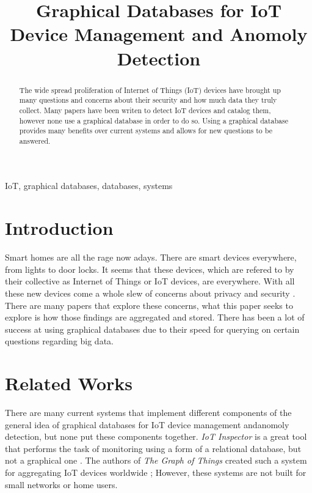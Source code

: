 \documentclass[conference]{IEEEtran}
\begin{document}
\title{Graphical Databases for IoT Device Management and Anomoly Detection}

\author{
}

\maketitle

\begin{abstract}
The wide spread proliferation of Internet of Things (IoT) devices
have brought up many questions and concerns about their security
and how much data they truly collect.
Many papers have been writen to detect IoT devices and catalog them,
however none use a graphical database in order to do so.
Using a graphical database provides many benefits over current systems
and allows for new questions to be answered.
\end{abstract}

\begin{IEEEkeywords}
IoT, graphical databases, databases, systems
\end{IEEEkeywords}

\section{Introduction}
Smart homes are all the rage now adays. There are smart devices everywhere, from lights to door locks.
It seems that these devices, which are refered to by their collective as Internet of Things or IoT devices, are everywhere.
With all these new devices come a whole slew of concerns about privacy and security \cite{IoTInspector}.
There are many papers that explore these concerns, what this paper seeks to explore is how those findings are
aggregated and stored. There has been a lot of success at using graphical databases due to their speed for querying
on certain questions regarding big data.

\section{Related Works}
There are many current systems that implement different components of the general idea of graphical databases for
IoT device management andanomoly detection, but none put these components together. \textit{IoT Inspector} is a great
tool that performs the task of monitoring using a form of a relational database, but not a graphical one \cite{IoTInspector}.
The authors of \textit{The Graph of Things} created such a system for aggregating IoT devices worldwide \cite{GraphofThings}; 
However, these systems are not built for small networks or home users.
\end{document}
